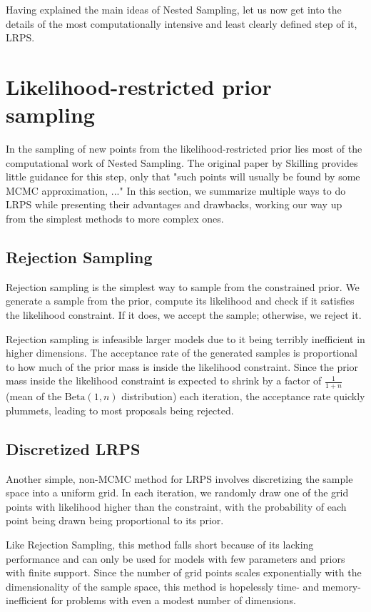 \documentclass[12pt, a4paper]{report}
\begin{document}
Having explained the main ideas of Nested Sampling, let us now get into the details of the most computationally intensive and least clearly defined step of it, LRPS.

\FloatBarrier
\section{Likelihood-restricted prior sampling}
In the sampling of new points from the likelihood-restricted prior lies most of the computational work of Nested Sampling.
The original paper by Skilling provides little guidance for this step, only that "such points will usually be found by some MCMC approximation, ..." \cite[6]{skilling}
In this section, we summarize multiple ways to do LRPS while presenting their advantages and drawbacks, working our way up from the simplest methods to more complex ones.

\subsection{Rejection Sampling}
Rejection sampling is the simplest way to sample from the constrained prior.
We generate a sample from the prior, compute its likelihood and check if it satisfies the likelihood constraint.
If it does, we accept the sample; otherwise, we reject it.

Rejection sampling is infeasible larger models due to it being terribly inefficient in higher dimensions.
The acceptance rate of the generated samples is proportional to how much of the prior mass is inside the likelihood constraint.
Since the prior mass inside the likelihood constraint is expected to shrink by a factor of $\frac{1}{1+n}$ (mean of the $\textrm{Beta}(1, n)$ distribution) each iteration, the acceptance rate quickly plummets, leading to most proposals being rejected.

\subsection{Discretized LRPS}
Another simple, non-MCMC method for LRPS involves discretizing the sample space into a uniform grid.
In each iteration, we randomly draw one of the grid points with likelihood higher than the constraint, with the probability of each point being drawn being proportional to its prior.

Like Rejection Sampling, this method falls short because of its lacking performance and can only be used for models with few parameters and priors with finite support.
Since the number of grid points scales exponentially with the dimensionality of the sample space, this method is hopelessly time- and memory-inefficient for problems with even a modest number of dimensions.
\end{document}
